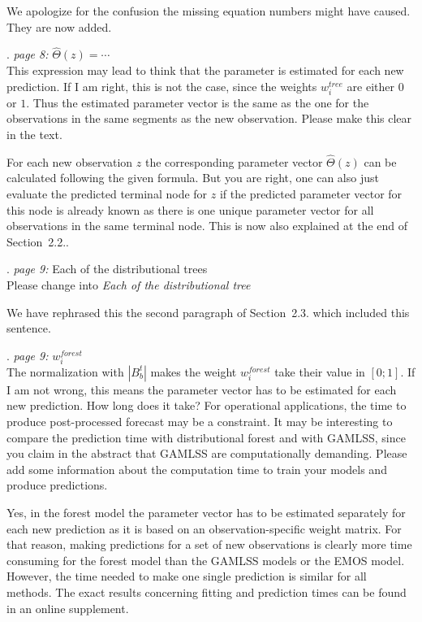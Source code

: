 \documentclass[american,foldmarks=false,noconfig]{uibklttr}
\newenvironment{review}{\fontshape{\itdefault}\fontseries{\bfdefault} \selectfont \smallskip}{\par}
\begin{document}
We apologize for the confusion the missing equation numbers 
might have caused. They are now added.

\begin{review}
8. {\color{quotecolor}\textit{page 8:} $\hat{\Theta}(z) = \cdots$}\\
This expression may lead to think that the parameter is estimated 
for each new prediction. If I am right, this is not the case, 
since the weights $w_i^{tree}$ are either $0$ or $1$. Thus the 
estimated parameter vector is the same as the one for the 
observations in the same segments as the new observation.
Please make this clear in the text.
\end{review}

For each new observation $z$ the corresponding 
parameter vector $\hat{\Theta}(z)$ can be calculated following 
the given formula. But you are right, one can also just evaluate 
the predicted terminal node for $z$ if the predicted parameter
vector for this node is already known as there is one unique 
parameter vector for all observations in the same terminal node.
This is now also explained at the end of Section~2.2..


\begin{review}
9. {\color{quotecolor}\textit{page 9:} Each of the distributional trees}\\
Please change into \textit{Each of the distributional tree}
\end{review}

We have rephrased this the second paragraph of Section~2.3. which
included this sentence.

\begin{review}
10. {\color{quotecolor}\textit{page 9:} $w_i^{forest}$}\\
The normalization with $|B_b^t|$ makes the weight $w_i^{forest}$ 
take their value in $[0; 1]$. If I am not wrong, this means the 
parameter vector has to be estimated for each new prediction. 
How long does it take? For operational applications, the time 
to produce post-processed forecast may be a constraint. It may 
be interesting to compare the prediction time with distributional 
forest and with GAMLSS, since you claim in the abstract that
GAMLSS are computationally demanding. Please add some information
about the computation time to train your models and produce predictions.
\end{review}

Yes, in the forest model the parameter vector has to be estimated 
separately for each new prediction as it is based on an 
observation-specific weight matrix. For that reason, making 
predictions for a set of new observations is clearly more 
time consuming for the forest model than the GAMLSS models 
or the EMOS model. However, the time needed to make one single 
prediction is similar for all methods. The exact results 
concerning fitting and prediction times can be found in an online 
supplement.
\end{document}
